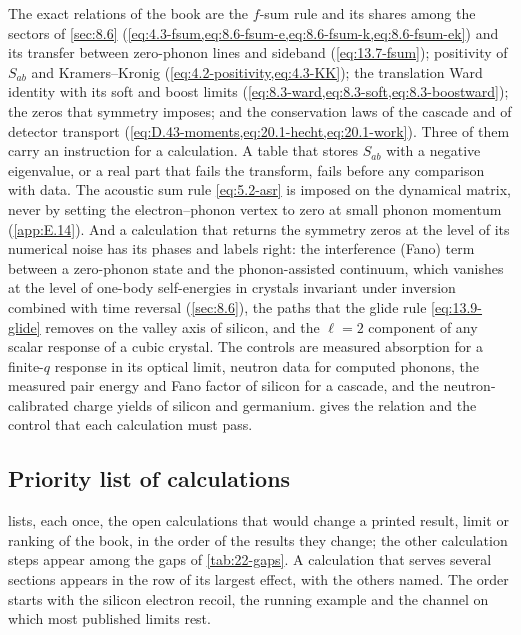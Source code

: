 The exact relations of the book are the $f$-sum rule and its shares among the sectors of \cref{sec:8.6} (\cref{eq:4.3-fsum,eq:8.6-fsum-e,eq:8.6-fsum-k,eq:8.6-fsum-ek}) and its transfer between zero-phonon lines and sideband (\cref{eq:13.7-fsum}); positivity of $S_{ab}$ and Kramers--Kronig (\cref{eq:4.2-positivity,eq:4.3-KK}); the translation Ward identity with its soft and boost limits (\cref{eq:8.3-ward,eq:8.3-soft,eq:8.3-boostward}); the zeros that symmetry imposes; and the conservation laws of the cascade and of detector transport (\cref{eq:D.43-moments,eq:20.1-hecht,eq:20.1-work}). Three of them carry an instruction for a calculation. A table that stores $S_{ab}$ with a negative eigenvalue, or a real part that fails the transform, fails before any comparison with data. The acoustic sum rule \cref{eq:5.2-asr} is imposed on the dynamical matrix, never by setting the electron--phonon vertex to zero at small phonon momentum (\cref{app:E.14}). And a calculation that returns the symmetry zeros at the level of its numerical noise has its phases and labels right: the interference (Fano) term between a zero-phonon state and the phonon-assisted continuum, which vanishes at the level of one-body self-energies in crystals invariant under inversion combined with time reversal (\cref{sec:8.6}), the paths that the glide rule \cref{eq:13.9-glide} removes on the valley axis of silicon, and the $\ell = 2$ component of any scalar response of a cubic crystal. The controls are measured absorption for a finite-$q$ response in its optical limit, neutron data for computed phonons, the measured pair energy and Fano factor of silicon for a cascade, and the neutron-calibrated charge yields of silicon and germanium.  gives the relation and the control that each calculation must pass.

\subsection{Priority list of calculations}\label{sec:22.1-list}

 lists, each once, the open calculations that would change a printed result, limit or ranking of the book, in the order of the results they change; the other calculation steps appear among the gaps of \cref{tab:22-gaps}. A calculation that serves several sections appears in the row of its largest effect, with the others named. The order starts with the silicon electron recoil, the running example and the channel on which most published limits rest.


